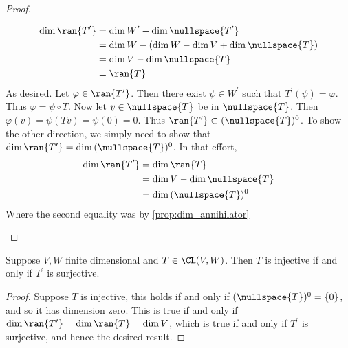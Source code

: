 \documentclass{article}
\begin{document}
  \begin{proof}
    \begin{enumerate}[label=\alph*)]
      \ii 
        \begin{align*}
          \dim{\ran{T^{\prime}}} & = \dim{W^{\prime}} - \dim{\nullspace{T^{\prime}}} \\
          & = \dim{W} - (\dim{W} - \dim{V} + \dim{\nullspace{T}}) \\
          & = \dim{V} - \dim{\nullspace{T}} \\
          & = \ran{T}
        \end{align*}
        As desired.
      \ii
        Let $\varphi \in \ran{T^{\prime}}$. Then there exist $\psi \in W^{\prime}$ such that $T^{\prime}(\psi) = \varphi$. Thus $\varphi = \psi \circ T$. Now let $v \in \nullspace{T}$ be in
        $\nullspace{T}$. Then $\varphi(v) = \psi(Tv) = \psi(0) = 0$. Thus $\ran{T^{\prime}} \subset (\nullspace{T})^0$. To show the other direction, we simply need to show that
        $\dim\ran{T^{\prime}} = \dim{(\nullspace{T})^0}$. In that effort,
        \begin{align*}
          \dim\ran{T^{\prime}} & = \dim\ran{T} \\
          & = \dim{V} - \dim{\nullspace{T}} \\
          & = \dim{(\nullspace{T})^0}
        \end{align*}
        Where the second equality was by \eqref{prop:dim_annihilator}
    \end{enumerate}
  \end{proof}
  \begin{prop}
    Suppose $V, W$ finite dimensional and $T \in \CL(V, W)$. Then $T$ is injective if and only if $T^{\prime}$ is surjective.
  \end{prop}
  \begin{proof}
      Suppose $T$ is injective, this holds if and only if $(\nullspace{T})^0 = \{0\}$, and so it has dimension zero. This is true if and only if $\dim\ran{T^{\prime}} = \dim\ran{T} = \dim
      V$, which is true if and only if $T^{\prime}$ is surjective, and hence the desired result.
  \end{proof}
\end{document}
